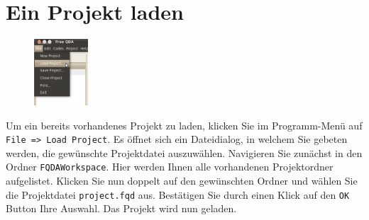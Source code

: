 \section {Ein Projekt laden}
\begin{figure}
 \vspace{-28pt}
 \begin{center}
    \includegraphics[width=0.18\textwidth]{img/loadproject}
  \end{center}
 
  \vspace{12pt}
\end{figure}
Um ein bereits vorhandenes Projekt zu laden, klicken Sie im Programm-Menü auf \texttt{File => Load Project}. Es öffnet sich ein %
Dateidialog, in welchem Sie gebeten werden, die gewünschte Projektdatei auszuwählen. Navigieren Sie zunächst in den Ordner %
\texttt{FQDAWorkspace}. Hier werden Ihnen alle vorhandenen Projektordner aufgelistet. Klicken Sie nun doppelt auf den gewünschten Ordner %
und wählen Sie die Projektdatei \texttt{project.fqd} aus. Bestätigen Sie durch einen Klick auf den \texttt{OK} Button Ihre Auswahl. %
Das Projekt wird nun geladen.


